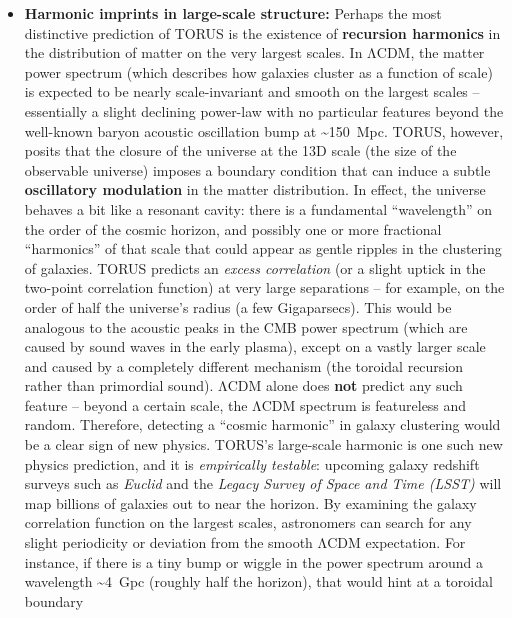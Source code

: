 \documentclass[
]{article}
\begin{document}
\begin{itemize}
\item
  \textbf{Harmonic imprints in large-scale structure:} Perhaps the most
  distinctive prediction of TORUS is the existence of \textbf{recursion
  harmonics} in the distribution of matter on the very largest scales.
  In ΛCDM, the matter power spectrum (which describes how galaxies
  cluster as a function of scale) is expected to be nearly
  scale-invariant and smooth on the largest scales -- essentially a
  slight declining power-law with no particular features beyond the
  well-known baryon acoustic oscillation bump at \textasciitilde150~Mpc.
  TORUS, however, posits that the closure of the universe at the 13D
  scale (the size of the observable universe) imposes a boundary
  condition that can induce a subtle \textbf{oscillatory modulation} in
  the matter distribution\hspace{0pt}. In effect, the universe behaves a
  bit like a resonant cavity: there is a fundamental ``wavelength'' on
  the order of the cosmic horizon, and possibly one or more fractional
  ``harmonics'' of that scale that could appear as gentle ripples in the
  clustering of galaxies. TORUS predicts an \emph{excess correlation}
  (or a slight uptick in the two-point correlation function) at very
  large separations -- for example, on the order of half the universe's
  radius (a few Gigaparsecs)\hspace{0pt}. This would be analogous to the
  acoustic peaks in the CMB power spectrum (which are caused by sound
  waves in the early plasma), except on a vastly larger scale and caused
  by a completely different mechanism (the toroidal recursion rather
  than primordial sound). ΛCDM alone does \textbf{not} predict any such
  feature -- beyond a certain scale, the ΛCDM spectrum is featureless
  and random. Therefore, detecting a ``cosmic harmonic'' in galaxy
  clustering would be a clear sign of new physics. TORUS's large-scale
  harmonic is one such new physics prediction, and it is
  \emph{empirically testable}: upcoming galaxy redshift surveys such as
  \emph{Euclid} and the \emph{Legacy Survey of Space and Time (LSST)}
  will map billions of galaxies out to near the horizon. By examining
  the galaxy correlation function on the largest scales, astronomers can
  search for any slight periodicity or deviation from the smooth ΛCDM
  expectation\hspace{0pt}. For instance, if there is a tiny bump or
  wiggle in the power spectrum around a wavelength \textasciitilde4~Gpc
  (roughly half the horizon), that would hint at a toroidal boundary

\end{itemize}
\end{document}
